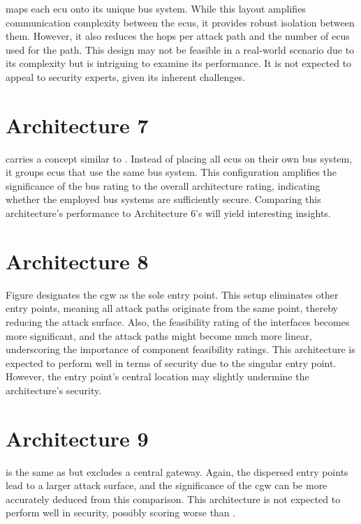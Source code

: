 maps each \acrshort{ecu} onto its unique bus system. 
While this layout amplifies communication complexity between the \acrshort{ecu}s, it provides robust isolation between them. 
However, it also reduces the hops per attack path and the number of \acrshort{ecu}s used for the path. 
This design may not be feasible in a real-world scenario due to its complexity but is intriguing to examine its performance. 
It is not expected to appeal to security experts, given its inherent challenges.

\section{Architecture 7}
\label{subsec:arch7}

 carries a concept similar to . 
Instead of placing all \acrshort{ecu}s on their own bus system, it groups \acrshort{ecu}s that use the same bus system.
This configuration amplifies the significance of the bus rating to the overall architecture rating, 
indicating whether the employed bus systems are sufficiently secure. 
Comparing this architecture's performance to Architecture 6's will yield interesting insights.
\section{Architecture 8}
\label{subsec:arch8}

Figure  designates the \acrshort{cgw} as the sole entry point. 
This setup eliminates other entry points, meaning all attack paths originate from the same point, thereby reducing the attack surface. 
Also, the feasibility rating of the interfaces becomes more significant, 
and the attack paths might become much more linear, underscoring the importance of component feasibility ratings. 
This architecture is expected to perform well in terms of security due to the singular entry point. 
However, the entry point's central location may slightly undermine the architecture's security.

\section{Architecture 9}
\label{subsec:arch9}

 is the same as  but excludes a central gateway. 
Again, the dispersed entry points lead to a larger attack surface, and the significance of the \acrshort{cgw} 
can be more accurately deduced from this comparison. 
This architecture is not expected to perform well in security, possibly scoring worse than .
